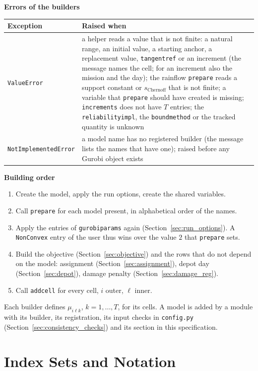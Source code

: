 \documentclass[11pt,a4paper]{article}
\makeatletter
\theoremstyle{plain}
\theoremstyle{definition}
\newcommand{\blockhead}[1]{\par\noindent\textbf{#1}\par\nobreak}
\renewcommand{\_}{\textunderscore\allowbreak{}}
\providecommand{\rejrow}[2]{{\raggedright #1\par} & {\raggedright #2\par} \\}
\providecommand{\tabstart}[2]{\begingroup\small\begin{longtable}{@{}#1@{}}\toprule #2 \\ \midrule \endhead}
\providecommand{\tabend}{\bottomrule\end{longtable}\endgroup}
\makeatother
\begin{document}
\blockhead{Errors of the builders}
\tabstart{p{4.2cm}p{10.8cm}}{Exception & Raised when}
\rejrow{\texttt{ValueError}}{a helper reads a value that is not finite: a natural range, an initial value, a starting anchor, a replacement value, \texttt{tangent\_ref} or an increment (the message names the cell; for an increment also the mission and the day); the rainflow \texttt{prepare} reads a support constant or $s_{\mathrm{Chernoff}}$ that is not finite; a variable that \texttt{prepare} should have created is missing; \texttt{increments} does not have $T$ entries; the \texttt{reliability\_impl}, the \texttt{bound\_method} or the tracked quantity is unknown}
\rejrow{\texttt{NotImplementedError}}{a model name has no registered builder (the message lists the names that have one); raised before any Gurobi object exists}
\tabend

\blockhead{Building order}
\begin{enumerate}[nosep,label=\arabic*.]
  \item Create the model, apply the run options, create the shared variables.
  \item Call \texttt{prepare} for each model present, in alphabetical order of the names.
  \item Apply the entries of \texttt{gurobi\_params} again (Section~\ref{sec:run_options}). A \texttt{NonConvex} entry of the user thus wins over the value $2$ that \texttt{prepare} sets.
  \item Build the objective (Section~\ref{sec:objective}) and the rows that do not depend on the model: assignment (Section~\ref{sec:assignment}), depot day (Section~\ref{sec:depot}), damage penalty (Section~\ref{sec:damage_reg}).
  \item Call \texttt{add\_cell} for every cell, $i$ outer, $\ell$ inner.
\end{enumerate}
Each builder defines $\mu_{i\ell k}$, $k = 1,\ldots,T$, for its cells. A model is added by a module with its builder, its registration, its input checks in \texttt{config.py} (Section~\ref{sec:consistency_checks}) and its section in this specification.

\section{Index Sets and Notation}
\label{sec:notation}
\end{document}

